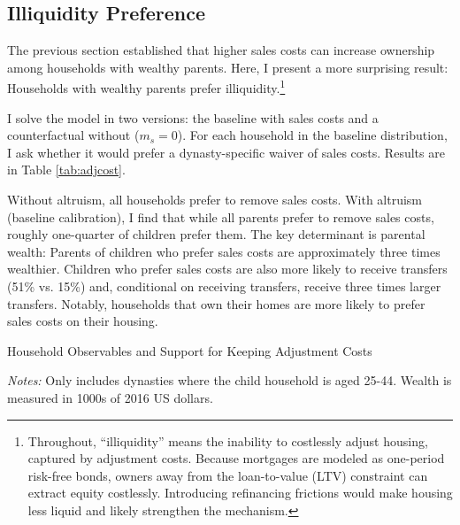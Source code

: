 \documentclass[12pt]{article}
\begin{document}
\subsection{Illiquidity Preference}\label{sec:adjcost}
The previous section established that higher sales costs can increase ownership among households with wealthy parents. Here, I present a more surprising result: Households with wealthy parents prefer illiquidity.\footnote{Throughout, ``illiquidity'' means the inability to costlessly adjust housing, captured by adjustment costs. Because mortgages are modeled as one-period risk-free bonds, owners away from the loan-to-value (LTV) constraint can extract equity costlessly. Introducing refinancing frictions would make housing less liquid and likely strengthen the mechanism.}

I solve the model in two versions: the baseline with sales costs and a counterfactual without ($m_s=0$). For each household in the baseline distribution, I ask whether it would prefer a dynasty-specific waiver of sales costs. Results are in Table \ref{tab:adjcost}.

Without altruism, all households prefer to remove sales costs. With altruism (baseline calibration), I find that while all parents prefer to remove sales costs, roughly one-quarter of children prefer them. The key determinant is parental wealth: Parents of children who prefer sales costs are approximately three times wealthier. Children who prefer sales costs are also more likely to receive transfers (51\% vs. 15\%) and, conditional on receiving transfers, receive three times larger transfers. Notably, households that own their homes are more likely to prefer sales costs on their housing.

\begin{table}
	\center
	\caption{Household Observables and Support for Keeping Adjustment Costs}\label{tab:adjcost}
	\begin{threeparttable}
		
		\footnotesize
		
	\end{threeparttable}
	{\begin{footnotesize}\begin{flushleft}\vspace{-0.1in}%
		\textit{Notes:} Only includes dynasties where the child household is aged 25-44. Wealth is measured in 1000s of 2016 US dollars.
	\end{flushleft}\end{footnotesize}}		
\end{table}
\end{document}
